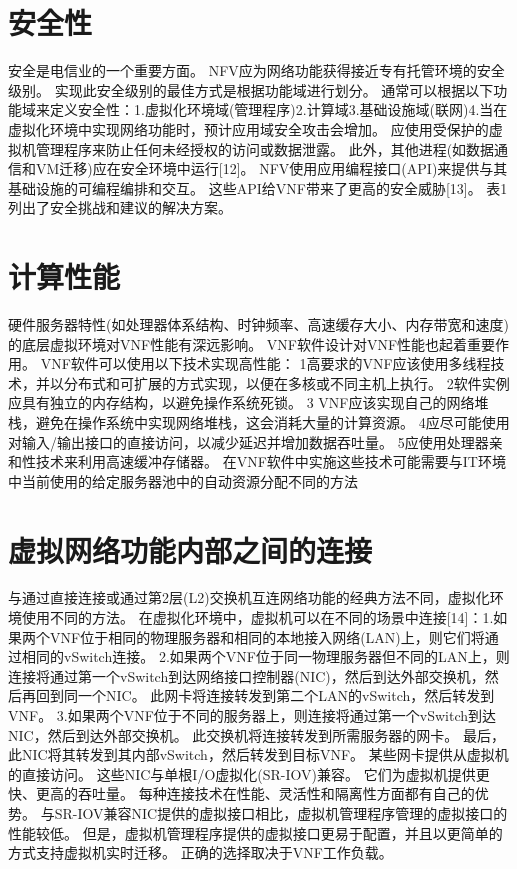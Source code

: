 \section{安全性}
安全是电信业的一个重要方面。
NFV应为网络功能获得接近专有托管环境的安全级别。
实现此安全级别的最佳方式是根据功能域进行划分。
通常可以根据以下功能域来定义安全性：1.虚拟化环境域(管理程序)2.计算域3.基础设施域(联网)4.当在虚拟化环境中实现网络功能时，预计应用域安全攻击会增加。
应使用受保护的虚拟机管理程序来防止任何未经授权的访问或数据泄露。
此外，其他进程(如数据通信和VM迁移)应在安全环境中运行[12]。
NFV使用应用编程接口(API)来提供与其基础设施的可编程编排和交互。
这些API给VNF带来了更高的安全威胁[13]。
表1列出了安全挑战和建议的解决方案。

\section{计算性能}
硬件服务器特性(如处理器体系结构、时钟频率、高速缓存大小、内存带宽和速度)的底层虚拟环境对VNF性能有深远影响。
VNF软件设计对VNF性能也起着重要作用。
VNF软件可以使用以下技术实现高性能：
1高要求的VNF应该使用多线程技术，并以分布式和可扩展的方式实现，以便在多核或不同主机上执行。
2软件实例应具有独立的内存结构，以避免操作系统死锁。
3 VNF应该实现自己的网络堆栈，避免在操作系统中实现网络堆栈，这会消耗大量的计算资源。
4应尽可能使用对输入/输出接口的直接访问，以减少延迟并增加数据吞吐量。
5应使用处理器亲和性技术来利用高速缓冲存储器。
在VNF软件中实施这些技术可能需要与IT环境中当前使用的给定服务器池中的自动资源分配不同的方法

\section{虚拟网络功能内部之间的连接}
与通过直接连接或通过第2层(L2)交换机互连网络功能的经典方法不同，虚拟化环境使用不同的方法。
在虚拟化环境中，虚拟机可以在不同的场景中连接[14]：1.如果两个VNF位于相同的物理服务器和相同的本地接入网络(LAN)上，则它们将通过相同的vSwitch连接。
2.如果两个VNF位于同一物理服务器但不同的LAN上，则连接将通过第一个vSwitch到达网络接口控制器(NIC)，然后到达外部交换机，然后再回到同一个NIC。
此网卡将连接转发到第二个LAN的vSwitch，然后转发到VNF。
3.如果两个VNF位于不同的服务器上，则连接将通过第一个vSwitch到达NIC，然后到达外部交换机。
此交换机将连接转发到所需服务器的网卡。
最后，此NIC将其转发到其内部vSwitch，然后转发到目标VNF。
某些网卡提供从虚拟机的直接访问。
这些NIC与单根I/O虚拟化(SR-IOV)兼容。
它们为虚拟机提供更快、更高的吞吐量。
每种连接技术在性能、灵活性和隔离性方面都有自己的优势。
与SR-IOV兼容NIC提供的虚拟接口相比，虚拟机管理程序管理的虚拟接口的性能较低。
但是，虚拟机管理程序提供的虚拟接口更易于配置，并且以更简单的方式支持虚拟机实时迁移。
正确的选择取决于VNF工作负载。

